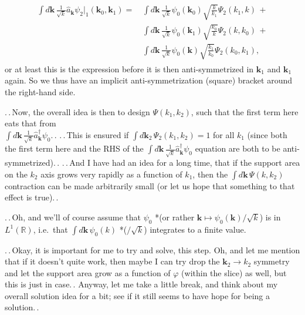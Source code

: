 \documentclass{report}
\begin{document}
\begin{align}
\begin{aligned}
	\int d\mathbf{k}\, 
		\frac{1}{\sqrt{k}} \hat a_\mathbf{k} \psi_2 \big|_1
			(\mathbf{k}_0, \mathbf{k}_1) 
	=
		&\,\int d\mathbf{k}\, \frac{1}{\sqrt{k}}
			\psi_0(\mathbf{k}_0)
			\sqrt{\frac{k}{k_1}}
			\Psi_2(k_1, k)
		\,+\\
		&\,\int d\mathbf{k}\, \frac{1}{\sqrt{k}}
			\psi_0(\mathbf{k}_1)
			\sqrt{\frac{k_0}{k}}
			\Psi_2(k, k_0)
		\,+\\
		&\,\int d\mathbf{k}\, \frac{1}{\sqrt{k}}
			\psi_0(\mathbf{k})
			\sqrt{\frac{k_1}{k_0}}
			\Psi_2(k_0, k_1),
\end{aligned}
\end{align}
or at least this is the expression before it is then anti-symmetrized in $\mathbf{k}_1$ and $\mathbf{k}_1$ again. So we thus have an implicit anti-symmetrization (square) bracket around the right-hand side. %

.\,.\,Now, the overall idea is then to design $\Psi(k_1, k_2)$, such that the first term here eats that from\\  
$\int d\mathbf{k}\, \frac{1}{\sqrt{k}} \hat a_\mathbf{k}^\dagger \psi_0$.\,. 
.\,.\,This is ensured if $\int d\mathbf{k}_2\, \Psi_2(k_1, k_2) = 1$ for all $k_1$ (since both the first term here and the RHS of the $\int d\mathbf{k}\, \frac{1}{\sqrt{k}} \hat a_\mathbf{k}^\dagger \psi_0$ equation are both to be anti-symmetrized).\,. 
.\,.\,And I have had an idea for a long time, that if the support area on the $k_2$ axis grows very rapidly as a function of $k_1$, then the $\int d\mathbf{k}\, \Psi(k, k_2)$ contraction can be made arbitrarily small (or let us hope that something to that effect is true).\,. %

.\,.\,Oh, and we'll of course assume that $\psi_0$ *(or rather $\mathbf{k}\mapsto \psi_0(\mathbf{k})/\sqrt{k}$) is in $L^1(\mathbb{R})$, i.e.\ that $\int d\mathbf{k}\, \psi_0(k)$ *($/\sqrt{k}$) integrates to a finite value. 

.\,.\,Okay, it is important for me to try and solve, this step. Oh, and let me mention that if it doesn't quite work, then maybe I can try drop the $\mathbf{k}_2 \to k_2$ symmetry and let the support area grow as a function of $\varphi$ (within the slice) as well, but this is just in case.\,. Anyway, let me take a little break, and think about my overall solution idea for a bit; see if it still seems to have hope for being a solution.\,. %
\end{document}
